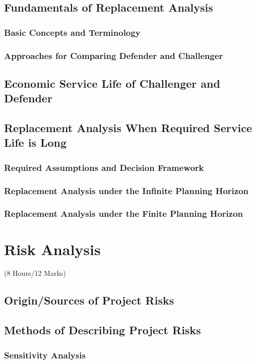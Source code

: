 \documentclass[12pt]{article}
\begin{document}
\subsection{Fundamentals of Replacement Analysis}
\subsubsection{Basic Concepts and Terminology}
\subsubsection{Approaches for Comparing Defender and Challenger}
\subsection{Economic Service Life of Challenger and Defender}
\subsection{Replacement Analysis When Required Service Life is Long}
\subsubsection{Required Assumptions and Decision Framework}
\subsubsection{Replacement Analysis under the Infinite Planning Horizon}
\subsubsection{Replacement Analysis under the Finite Planning Horizon}

\pagebreak
\section{Risk Analysis}
\begin{center}(8 Hours/12 Marks)\end{center}
\subsection{Origin/Sources of Project Risks}
\subsection{Methods of Describing Project Risks}
\subsubsection{Sensitivity Analysis}
\end{document}
